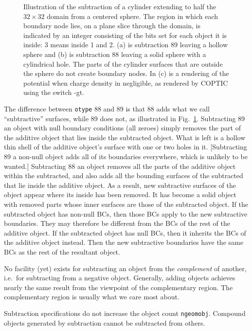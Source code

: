 \documentclass[12pt]{article}
\begin{document}
\begin{figure}[htp]
\caption{Illustration of the subtraction of a cylinder extending to
  half the $32\times32$ domain from a centered sphere. The region in
  which each boundary node lies, on a plane slice through the domain,
  is indicated by an integer consisting of the bits set for each
  object it is inside: 3 means inside 1 and 2. (a) is subtraction 89
  leaving a hollow sphere and (b) is subtraction 88 leaving a solid
  sphere with a cylindrical hole. The parts of the cylinder surfaces
  that are outside the sphere do not create boundary nodes. In (c) is a
  rendering of the potential when charge density in
  negligible, as rendered by COPTIC using the switch -gt.\label{textgraph}}
\end{figure}

The difference between \verb!otype! 88 and 89 is that 88 adds what we
call ``subtractive'' surfaces, while 89 does not, as illustrated in
Fig.\ \ref{textgraph}. Subtracting 89 an
object with null boundary conditions (all zeroes) simply removes the
part of the additive object that lies inside the subtracted
object. What is left is a hollow thin shell of the additive object's
surface with one or two holes in it. [Subtracting 89 a non-null object
adds all of its boundaries everywhere, which is unlikely to be
wanted.]  Subtracting 88 an object removes all the parts of the
additive object within the subtracted, and also adds all the bounding
surfaces of the subtracted that lie inside the additive object. As a
result, new subtractive surfaces of the object appear where its inside
has been removed. It has become a solid object with removed parts
whose inner surfaces are those of the subtracted object. If the
subtracted object has non-null BCs, then those BCs apply to the new
subtractive boundaries. They may therefore be different from the BCs
of the rest of the additive object. If the subtracted object has null
BCs, then it inherits the BCs of the additive object instead. Then the
new subtractive boundaries have the same BCs as the rest of the
resultant object.


No facility (yet) exists for subtracting an object from the
\emph{complement} of another, i.e.\ for subtracting from a negative
object. Generally, adding objects achieves nearly the same result from
the viewpoint of the complementary region. The complementary region is
usually what we care most about.

Subtraction specifications do not increase the object count
\verb!ngeomobj!. Compound objects generated by subtraction cannot be
subtracted from others.
\end{document}
